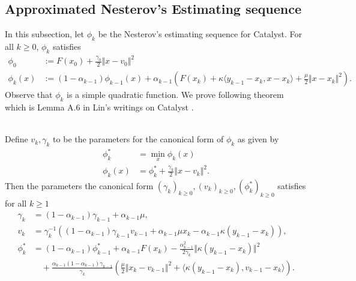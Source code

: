 \documentclass[12pt]{article}
\begin{document}
    \subsection{Approximated Nesterov's Estimating sequence}
        In this subsection, let $\phi_k$ be the Nesterov's estimating sequence for Catalyst. 
        For all $k \ge0$, $\phi_k$ satisfies 
        \begin{align*}
            \phi_0 &:= F(x_0) + \frac{\gamma_0}{2}\Vert x - v_0\Vert^2
            \\
            \phi_k(x) &:= 
            (1 - \alpha_{k - 1})\phi_{k - 1}(x) + 
            \alpha_{k - 1}\left(
                F(x_k) + \kappa\langle y_{k - 1} - x_k, x - x_k\rangle
                + \frac{\mu}{2} \Vert x - x_k\Vert^2
            \right). 
        \end{align*}
        Observe that $\phi_k$ is a simple quadratic function. 
        We prove following theorem which is Lemma A.6 in Lin's writings on Catalyst \cite{lin_universal_2015}. 
        \begin{theorem}\;\\
            Define $v_k, \gamma_k$ to be the parameters for the canonical form of $\phi_k$ as given by 
            \begin{align*}
                \phi_k^* &= \min_x \phi_k(x)
                \\
                \phi_k(x) &= \phi_k^* + \frac{\gamma_k}{2}\Vert x - v_k\Vert^2. 
            \end{align*}
            Then the parameters the canonical form $(\gamma_{k})_{k \ge0}, (v_k)_{k \ge 0}, (\phi_k^*)_{k\ge 0}$ satisfies for all $k \ge 1$
            \begin{align*}
                \gamma_k &= (1 - \alpha_{k - 1})\gamma_{k - 1} + \alpha_{k - 1}\mu, 
                \\
                v_k &= 
                \gamma_k^{-1}(
                    (1 - \alpha_{k - 1})\gamma_{k - 1}v_{k - 1}
                    + \alpha_{k - 1}\mu x_k - \alpha_{k - 1}\kappa(y_{k - 1} - x_k)
                ), 
                \\
                \phi_k^* &= (1 - \alpha_{k - 1})\phi_{k - 1}^*
                + \alpha_{k - 1}F(x_k)
                - \frac{\alpha_{k - 1}^2}{2\gamma_k}\Vert \kappa(y_{k - 1} - x_k)\Vert^2
                \\
                &\quad 
                + \frac{\alpha_{k - 1}(1 - \alpha_{k - 1})\gamma_{k - 1}}{\gamma_k}
                \left(
                    \frac{\mu}{2}\Vert x_k - v_{k - 1}\Vert^2 + 
                    \langle \kappa(y_{k - 1} - x_k), v_{k - 1} - x_k\rangle
                \right). 
            \end{align*}
        \end{theorem}
\end{document}
